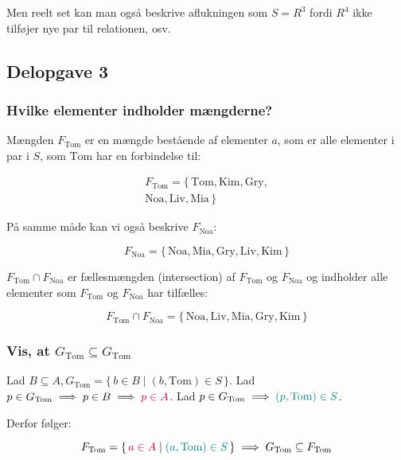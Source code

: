 Men reelt set kan man også beskrive aflukningen som \(S = R^{3}\) fordi \(R^4\) ikke tilføjer nye par til
relationen, osv.

\subsection{Delopgave 3}\label{subsec:delopgave-3}

\subsubsection{Hvilke elementer indholder mængderne?}

Mængden \(F_{\text{Tom}}\) er en mængde bestående af elementer \(a\), som er alle elementer i par i \(S\), som
\(\text{Tom}\) har en forbindelse til:

\begin{equation}
    \begin{split}
        F_{\text{Tom}} = \{\,\text{Tom}, \text{Kim}, \text{Gry}, \\
        \text{Noa}, \text{Liv}, \text{Mia}\,\}
    \end{split}\label{eq:equation9}
\end{equation}

På samme måde kan vi også beskrive \(F_{\text{Noa}}\):

\begin{equation}
    F_{\text{Noa}} = \{\,\text{Noa}, \text{Mia}, \text{Gry}, \text{Liv}, \text{Kim}\,\}\label{eq:equation8}
\end{equation}

\(F_{\text{Tom}} \cap F_{\text{Noa}}\) er fællesmængden (intersection) af \(F_{\text{Tom}}\) og \(F_{\text{Noa}}\)
og indholder alle elementer som \(F_{\text{Tom}}\) og \(F_{\text{Noa}}\) har tilfælles:

\begin{equation}
    F_{\text{Tom}} \cap F_{\text{Noa}} = \{\,\text{Noa}, \text{Liv}, \text{Mia}, \text{Gry}, \text{Kim}\,\}
    \label{eq:equation10}
\end{equation}

\subsubsection{Vis, at \(G_{\text{Tom}} \subseteq G_{\text{Tom}}\)}

Lad \(B \subseteq A, G_{\text{Tom}} = \{\,b \in B \mid (b, \text{Tom}) \in S\,\}\label{eq:equation11}\).
Lad \(p \in G_{\text{Tom}} \implies p \in B \implies \textcolor{purple}{p \in A}\).
Lad \(p \in G_{\text{Tom}} \implies \textcolor{teal}{(p, \text{Tom}) \in S}\).

Derfor følger:

\begin{equation}
    F_{\text{Tom}} = \{\,\textcolor{purple}{a \in A} \mid \textcolor{teal}{(a, \text{Tom}) \in S}\,\} \implies
    G_{\text{Tom}} \subseteq F_{\text{Tom}}\label{eq:equation2}
\end{equation}
